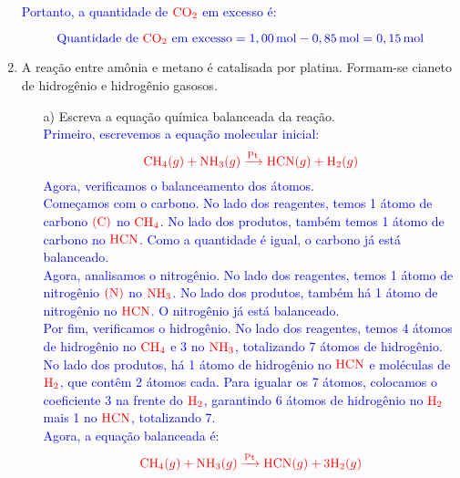 \documentclass[a4paper, 12pt]{article}
\begin{document}
\begin{enumerate}
          \textcolor{blue}{Portanto, a quantidade de \(\textcolor{red}{\text{CO}_2}\) em excesso é:}

          \[
              \textcolor{blue}{\text{Quantidade de } \textcolor{red}{\text{CO}_2} \text{ em excesso} = 1,00 \, \text{mol} - 0,85 \, \text{mol} = 0,15 \, \text{mol}}
          \]
          \pagebreak

    \item A reação entre amônia e metano é catalisada por platina. Formam-se
          cianeto de hidrogênio e hidrogênio gasosos.
          \begin{enumerate}[align=left, labelsep=-0.5em]
              \item[a)] Escreva a equação química balanceada da reação.
                    \\[10pt]
                    \textcolor{blue}{Primeiro, escrevemos a equação molecular inicial:}
                    \[
                        \textcolor{red}{\text{CH}_4 (g) + \text{NH}_3 (g) \xrightarrow{\text{Pt}} \text{HCN} (g) + \text{H}_2 (g)}
                    \]
                    \textcolor{blue}{Agora, verificamos o balanceamento dos átomos.}
                    \\[10pt]
                    \textcolor{blue}{Começamos com o carbono. No lado dos reagentes, temos 1 átomo de carbono \(\textcolor{red}{(\text{C})}\) no \(\textcolor{red}{\text{CH}_4}\). No lado dos produtos, também temos 1 átomo de carbono no \(\textcolor{red}{\text{HCN}}\). Como a quantidade é igual, o carbono já está balanceado.}
                    \\[10pt]
                    \textcolor{blue}{Agora, analisamos o nitrogênio. No lado dos reagentes, temos 1 átomo de nitrogênio \(\textcolor{red}{(\text{N})}\) no \(\textcolor{red}{\text{NH}_3}\). No lado dos produtos, também há 1 átomo de nitrogênio no \(\textcolor{red}{\text{HCN}}\). O nitrogênio já está balanceado.}
                    \\[10pt]
                    \textcolor{blue}{Por fim, verificamos o hidrogênio. No lado dos reagentes, temos 4 átomos de hidrogênio no \(\textcolor{red}{\text{CH}_4}\) e 3 no \(\textcolor{red}{\text{NH}_3}\), totalizando 7 átomos de hidrogênio. No lado dos produtos, há 1 átomo de hidrogênio no \(\textcolor{red}{\text{HCN}}\) e moléculas de \(\textcolor{red}{\text{H}_2}\), que contêm 2 átomos cada. Para igualar os 7 átomos, colocamos o coeficiente 3 na frente do \(\textcolor{red}{\text{H}_2}\), garantindo 6 átomos de hidrogênio no \(\textcolor{red}{\text{H}_2}\) mais 1 no \(\textcolor{red}{\text{HCN}}\), totalizando 7.}
                    \\[10pt]
                    \textcolor{blue}{Agora, a equação balanceada é:}
                    \[
                        \textcolor{red}{\text{CH}_4 (g) + \text{NH}_3 (g) \xrightarrow{\text{Pt}} \text{HCN} (g) + 3 \text{H}_2 (g)}
                    \]


\end{enumerate}
\end{enumerate}
\end{document}
